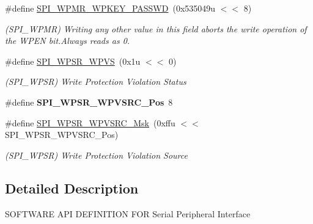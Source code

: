 \begin{DoxyCompactItemize}
\item 
\mbox{\label{group__SAME70__SPI_gad5eacda218874e9f160526fd09b840f7}} 
\#define \mbox{\hyperlink{group__SAME70__SPI_gad5eacda218874e9f160526fd09b840f7}{S\+P\+I\+\_\+\+W\+P\+M\+R\+\_\+\+W\+P\+K\+E\+Y\+\_\+\+P\+A\+S\+S\+WD}}~(0x535049u $<$$<$ 8)
\begin{DoxyCompactList}\small\item\em (S\+P\+I\+\_\+\+W\+P\+MR) Writing any other value in this field aborts the write operation of the W\+P\+EN bit.\+Always reads as 0. \end{DoxyCompactList}\item 
\mbox{\label{group__SAME70__SPI_ga2fdfc086344d7f94c78b3411f9300ff6}} 
\#define \mbox{\hyperlink{group__SAME70__SPI_ga2fdfc086344d7f94c78b3411f9300ff6}{S\+P\+I\+\_\+\+W\+P\+S\+R\+\_\+\+W\+P\+VS}}~(0x1u $<$$<$ 0)
\begin{DoxyCompactList}\small\item\em (S\+P\+I\+\_\+\+W\+P\+SR) Write Protection Violation Status \end{DoxyCompactList}\item 
\mbox{\label{group__SAME70__SPI_gab5938ab029cbff7d33f85030efee59a1}} 
\#define {\bfseries S\+P\+I\+\_\+\+W\+P\+S\+R\+\_\+\+W\+P\+V\+S\+R\+C\+\_\+\+Pos}~8
\item 
\mbox{\label{group__SAME70__SPI_ga85243137e58ab2f2dfe757f0d5847744}} 
\#define \mbox{\hyperlink{group__SAME70__SPI_ga85243137e58ab2f2dfe757f0d5847744}{S\+P\+I\+\_\+\+W\+P\+S\+R\+\_\+\+W\+P\+V\+S\+R\+C\+\_\+\+Msk}}~(0xffu $<$$<$ S\+P\+I\+\_\+\+W\+P\+S\+R\+\_\+\+W\+P\+V\+S\+R\+C\+\_\+\+Pos)
\begin{DoxyCompactList}\small\item\em (S\+P\+I\+\_\+\+W\+P\+SR) Write Protection Violation Source \end{DoxyCompactList}\end{DoxyCompactItemize}


\subsection{Detailed Description}
S\+O\+F\+T\+W\+A\+RE A\+PI D\+E\+F\+I\+N\+I\+T\+I\+ON F\+OR Serial Peripheral Interface 